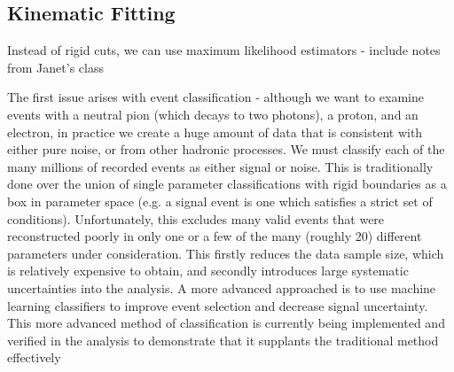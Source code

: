     \clearpage














\subsection{Kinematic Fitting}

    Instead of rigid cuts, we can use maximum likelihood estimators - include notes from Janet's class

    The first issue arises with event classification - although we want to examine events with a neutral pion (which decays
to two photons), a proton, and an electron, in practice we create a huge amount of data that is consistent with either pure
noise, or from other hadronic processes. We must classify each of the many millions of recorded events as either signal or
noise. This is traditionally done over the union of single parameter classifications with rigid boundaries as a box in parameter
space (e.g. a signal event is one which satisfies a strict set of conditions). Unfortunately, this excludes many valid events that
were reconstructed poorly in only one or a few of the many (roughly 20) different parameters under consideration. This firstly
reduces the data sample size, which is relatively expensive to obtain, and secondly introduces large systematic uncertainties
into the analysis. A more advanced approached is to use machine learning classifiers to improve event selection and decrease
signal uncertainty. This more advanced method of classification is currently being implemented and verified in the analysis to
demonstrate that it supplants the traditional method effectively


